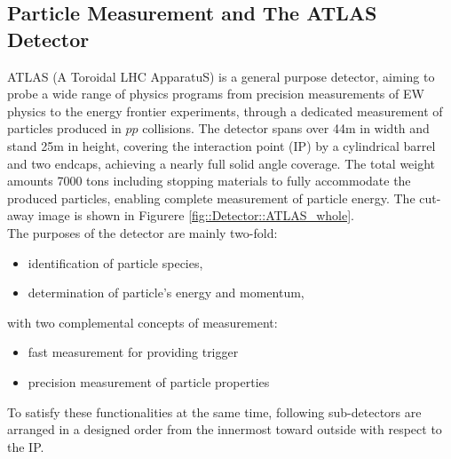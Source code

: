

\subsection{Particle Measurement and The ATLAS Detector}
ATLAS (A Toroidal LHC ApparatuS) is a general purpose detector, aiming to probe a wide range of physics programs from precision measurements of EW physics to the energy frontier experiments, through a dedicated measurement of particles produced in $pp$ collisions. The detector spans over 44m in width and stand 25m in height, covering the interaction point (IP) by a cylindrical barrel and two endcaps, achieving a nearly full solid angle coverage. The total weight amounts 7000 tons including stopping materials to fully accommodate the produced particles, enabling complete measurement of particle energy. The cut-away image is shown in Figurere \ref{fig::Detector::ATLAS_whole}. \\

The purposes of the detector are mainly two-fold:
\begin{itemize}
\item identification of particle species,
\item determination of particle's energy and momentum,
\end{itemize}
with two complemental concepts of measurement:
\begin{itemize}
\item fast measurement for providing trigger
\item precision measurement of particle properties
\end{itemize}
 
To satisfy these functionalities at the same time, following sub-detectors are arranged in a designed order from the innermost toward outside with respect to the IP.

